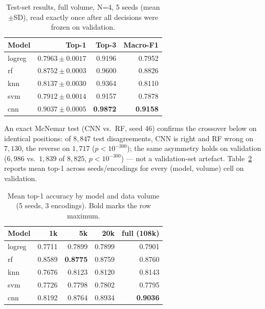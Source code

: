 \documentclass[conference,a4paper]{IEEEtran}
\begin{document}
\begin{table}[t]
\centering
\caption{Test-set results, full volume, N=4, 5 seeds (mean$\pm$SD), read
exactly once after all decisions were frozen on validation.}
\label{tab:testresults}
\begin{tabular}{lrrr}
\toprule
Model & Top-1 & Top-3 & Macro-F1 \\
\midrule
logreg & $0.7963\pm0.0017$ & 0.9196 & 0.7952 \\
rf & $0.8752\pm0.0003$ & 0.9600 & 0.8826 \\
knn & $0.8137\pm0.0030$ & 0.9364 & 0.8110 \\
svm & $0.7912\pm0.0014$ & 0.9157 & 0.7878 \\
cnn & $\mathbf{0.9037\pm0.0005}$ & \textbf{0.9872} & \textbf{0.9158} \\
\bottomrule
\end{tabular}
\end{table}

An exact McNemar test (CNN vs.\ RF, seed 46) confirms the crossover below on
identical positions: of $8{,}847$ test disagreements, CNN is right and RF
wrong on $7{,}130$, the reverse on $1{,}717$ ($p<10^{-300}$); the same
asymmetry holds on validation ($6{,}986$ vs.\ $1{,}839$ of $8{,}825$,
$p<10^{-300}$) --- not a validation-set artefact. Table~\ref{tab:top1}
reports mean top-1 across seeds/encodings for every (model, volume) cell on
validation.

\begin{table}[t]
\centering
\caption{Mean top-1 accuracy by model and data volume (5 seeds, 3
encodings). Bold marks the row maximum.}
\label{tab:top1}
\begin{tabular}{lrrrr}
\toprule
Model & 1k & 5k & 20k & full (108k) \\
\midrule
logreg & 0.7711 & 0.7899 & 0.7899 & 0.7901 \\
rf & 0.8589 & \textbf{0.8775} & 0.8759 & 0.8760 \\
knn & 0.7676 & 0.8123 & 0.8120 & 0.8143 \\
svm & 0.7726 & 0.7798 & 0.7802 & 0.7795 \\
cnn & 0.8192 & 0.8764 & 0.8934 & \textbf{0.9036} \\
\bottomrule
\end{tabular}
\end{table}
\end{document}
